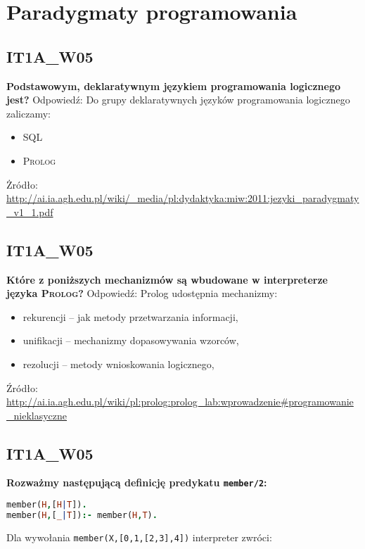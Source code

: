 
\chapter{Paradygmaty programowania}
\lstset{language=Prolog}

\section{IT1A\_W05}
\textbf{Podstawowym, deklaratywnym językiem programowania logicznego jest?}
\vspace{0.4cm}
Odpowiedź: \newline
Do grupy deklaratywnych języków programowania logicznego zaliczamy:
\begin{itemize}
\item SQL
\item \textsc{Prolog}
\end{itemize}
\vspace{0.4cm}
Żródło: \url{http://ai.ia.agh.edu.pl/wiki/_media/pl:dydaktyka:miw:2011:jezyki_paradygmaty_v1_1.pdf}

\section{IT1A\_W05}
\textbf{Które z poniższych mechanizmów są wbudowane w interpreterze języka \textsc{Prolog}?}
Odpowiedź: \newline
Prolog udostępnia mechanizmy:
\begin{itemize}
\item  rekurencji -- jak metody przetwarzania informacji,
\item unifikacji -- mechanizmy dopasowywania wzorców,
\item rezolucji -- metody wnioskowania logicznego,
\end{itemize}
Źródło:
\url{http://ai.ia.agh.edu.pl/wiki/pl:prolog:prolog_lab:wprowadzenie\#programowanie_nieklasyczne}



\section{IT1A\_W05}

\textbf{Rozważmy następującą definicję predykatu \lstinline!member/2!:}
\begin{lstlisting}[language=Prolog, frame=trbl]
member(H,[H|T]).
member(H,[_|T]):- member(H,T).
\end{lstlisting}
Dla wywołania \lstinline!member(X,[0,1,[2,3],4])! interpreter zwróci:

